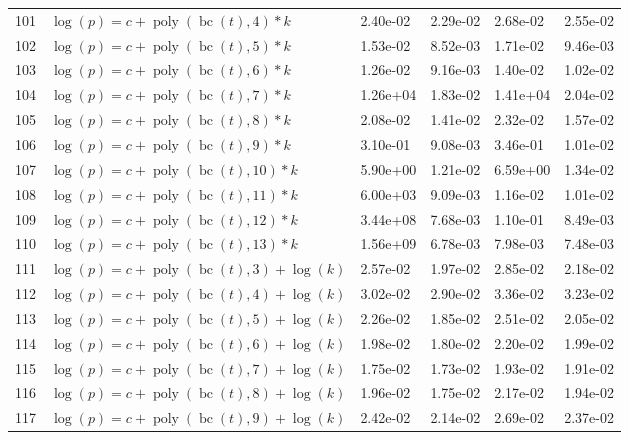 \documentclass[12pt,a4paper]{article}
\DeclareMathOperator{\bc}{bc}
\DeclareMathOperator{\poly}{poly}
\begin{document}
\begin{longtable}[t]{ll>{\raggedleft\arraybackslash}p{2cm}>{\raggedleft\arraybackslash}p{2cm}>{\raggedleft\arraybackslash}p{2cm}>{\raggedleft\arraybackslash}p{2cm}}
\rowcolor{gray!6}  101 & $\log(p) = c + \poly\left( \bc(t), 4 \right) * k$ & 2.40e-02 & 2.29e-02 & 2.68e-02 & 2.55e-02\\
102 & $\log(p) = c + \poly\left( \bc(t), 5 \right) * k$ & 1.53e-02 & 8.52e-03 & 1.71e-02 & 9.46e-03\\
\rowcolor{gray!6}  103 & $\log(p) = c + \poly\left( \bc(t), 6 \right) * k$ & 1.26e-02 & 9.16e-03 & 1.40e-02 & 1.02e-02\\
104 & $\log(p) = c + \poly\left( \bc(t), 7 \right) * k$ & 1.26e+04 & 1.83e-02 & 1.41e+04 & 2.04e-02\\
\rowcolor{gray!6}  105 & $\log(p) = c + \poly\left( \bc(t), 8 \right) * k$ & 2.08e-02 & 1.41e-02 & 2.32e-02 & 1.57e-02\\
106 & $\log(p) = c + \poly\left( \bc(t), 9 \right) * k$ & 3.10e-01 & 9.08e-03 & 3.46e-01 & 1.01e-02\\
\rowcolor{gray!6}  107 & $\log(p) = c + \poly\left( \bc(t), 10 \right) * k$ & 5.90e+00 & 1.21e-02 & 6.59e+00 & 1.34e-02\\
108 & $\log(p) = c + \poly\left( \bc(t), 11 \right) * k$ & 6.00e+03 & 9.09e-03 & 1.16e-02 & 1.01e-02\\
\rowcolor{gray!6}  109 & $\log(p) = c + \poly\left( \bc(t), 12 \right) * k$ & 3.44e+08 & 7.68e-03 & 1.10e-01 & 8.49e-03\\
110 & $\log(p) = c + \poly\left( \bc(t), 13 \right) * k$ & 1.56e+09 & 6.78e-03 & 7.98e-03 & 7.48e-03\\
\rowcolor{gray!6}  111 & $\log(p) = c + \poly\left( \bc(t), 3 \right) + \log(k)$ & 2.57e-02 & 1.97e-02 & 2.85e-02 & 2.18e-02\\
112 & $\log(p) = c + \poly\left( \bc(t), 4 \right) + \log(k)$ & 3.02e-02 & 2.90e-02 & 3.36e-02 & 3.23e-02\\
\rowcolor{gray!6}  113 & $\log(p) = c + \poly\left( \bc(t), 5 \right) + \log(k)$ & 2.26e-02 & 1.85e-02 & 2.51e-02 & 2.05e-02\\
114 & $\log(p) = c + \poly\left( \bc(t), 6 \right) + \log(k)$ & 1.98e-02 & 1.80e-02 & 2.20e-02 & 1.99e-02\\
\rowcolor{gray!6}  115 & $\log(p) = c + \poly\left( \bc(t), 7 \right) + \log(k)$ & 1.75e-02 & 1.73e-02 & 1.93e-02 & 1.91e-02\\
116 & $\log(p) = c + \poly\left( \bc(t), 8 \right) + \log(k)$ & 1.96e-02 & 1.75e-02 & 2.17e-02 & 1.94e-02\\
\rowcolor{gray!6}  117 & $\log(p) = c + \poly\left( \bc(t), 9 \right) + \log(k)$ & 2.42e-02 & 2.14e-02 & 2.69e-02 & 2.37e-02\\

\end{longtable}
\end{document}
